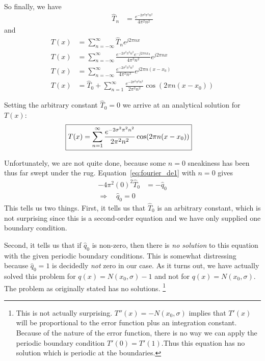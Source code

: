 \documentclass[twocolumn]{myarticle}
\begin{document}
So finally, we have
\begin{align}
    \hat{T}_n &= \frac{e^{-2 \sigma^2 \pi^2 n^2}}{4 \pi^2 n^2}
\end{align}
and
\begin{align}
    T(x) &= \sum_{n=-\infty}^{\infty} \hat{T}_n e^{j 2 \pi n x} 
    \\
    T(x) &= \sum_{n=-\infty}^{\infty} \frac{e^{-2 \sigma^2 \pi^2 n^2} e^{- j 2 \pi n x_0 } }{4 \pi^2 n^2} e^{j 2 \pi n x}
    \\
    T(x) &= \sum_{n=-\infty}^{\infty} \frac{e^{-2 \sigma^2 \pi^2 n^2}}{4 \pi^2 n^2} e^{j 2 \pi n (x-x_0)}
    \\
    T(x) &= \hat{T}_0 + \sum_{n=1}^{\infty} \frac{e^{-2 \sigma^2 \pi^2 n^2}}{2 \pi^2 n^2} \cos(2 \pi n (x-x_0)) 
\end{align}

Setting the arbitrary constant $ \hat{T}_0 = 0 $ we arrive at an analytical solution for $ T(x) $:
\begin{align}
    \Aboxed{T(x) &= \sum_{n=1}^{\infty} \frac{e^{-2 \sigma^2 \pi^2 n^2}}{2 \pi^2 n^2} \cos(2 \pi n (x-x_0))}
\end{align}

Unfortunately, we are not quite done, because some $ n = 0 $ sneakiness has been thus far swept under the rug.
Equation~\ref{eq:fourier_de1} with $ n = 0 $ gives
\begin{align}
    - 4 \pi^2 (0)^2 \hat{T}_0 &= - \hat{q}_0
    \\
    \Longrightarrow \quad \hat{q}_0 = 0
\end{align}
This tells us two things.
First, it tells us that $ \hat{T}_0 $ is an arbitrary constant, which is not surprising since this is a second-order equation and we have only supplied one boundary condition.

Second, it tells us that if $ \hat{q}_0 $ is non-zero, then there is \emph{no solution} to this equation with the given periodic boundary conditions.
This is somewhat distressing because $ \hat{q}_0 = 1 $ is decidedly \emph{not} zero in our case.
As it turns out, we have actually solved this problem for $ q(x) = N(x_0, \sigma) - 1 $ and not for $ q(x) = N(x_0, \sigma) $.
The problem as originally stated has no solutions.
\footnote{This is not actually surprising. $ T''(x) = - N(x_0, \sigma) $ implies that $ T'(x) $ will be proportional to the error function plus an integration constant. Because of the nature of the error function, there is no way we can apply the periodic boundary condition $ T'(0) = T'(1) $.Thus this equation has no solution which is periodic at the boundaries. }
\end{document}
